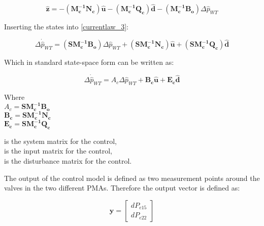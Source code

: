  \begin{equation}
 \pmb{\hat{z}} =  - (\pmb{M_c^{-1}}\pmb{N_c}) \pmb{\hat{u}} - (\pmb{M_c^{-1}}\pmb{Q_c}) \pmb{\hat{d}} - (\pmb{M_c^{-1}}\pmb{B_o}) \Delta \hat{p}_{WT}    
 \label{statespace_control_sys_state}
\end{equation}

Inserting the states into \eqref{currentlaw_3}:

 \begin{equation}
\Delta \dot{\hat{p}}_{WT} = (\pmb{S}\pmb{M_c^{-1}}\pmb{B_o}) \Delta \hat{p}_{WT}  + (\pmb{S}\pmb{M_c^{-1}}\pmb{N_c}) \pmb{\hat{u}} + (\pmb{S}\pmb{M_c^{-1}}\pmb{Q_c}) \pmb{\hat{d}} 
 \label{statespace_control_sys_state_1}
\end{equation}

Which in standard state-space form can be written as: 

 \begin{equation}
\Delta \dot{\hat{p}}_{WT} = A_c \Delta \hat{p}_{WT}  + \pmb{B_c} \pmb{\hat{u}} + \pmb{E_c} \pmb{\hat{d}} 
 \label{statespace_control_sys_state_2}
\end{equation}

\begin{minipage}[t]{0.40\textwidth}
Where\\
\hspace*{8mm} $A_c = \pmb{S}\pmb{M_c^{-1}}\pmb{B_o} $ \\
\hspace*{8mm} $\pmb{B_c} = \pmb{S}\pmb{M_c^{-1}}\pmb{N_c} $ \\
\hspace*{8mm} $\pmb{E_c} = \pmb{S}\pmb{M_c^{-1}}\pmb{Q_c} $
\end{minipage}
\begin{minipage}[t]{0.48\textwidth}
\vspace*{1mm}
is the system matrix for the control, \\
is the input matrix for the control, \\
is the disturbance matrix for the control.
\end{minipage} 

The output of the control model is defined as two measurement points around the valves in the two different PMAs. Therefore the output vector is defined as: 

\begin{equation}
\pmb{y} =
\begin{bmatrix} 
dP_{e15} \\
dP_{e22} 
\label{outputvector_control}
\end{bmatrix} 
\end{equation}

